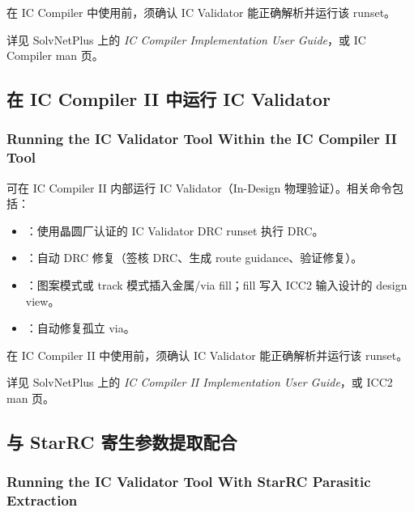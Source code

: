 \begin{noteBox}
在 IC Compiler 中使用前，须确认 IC Validator 能正确解析并运行该 runset。
\end{noteBox}

\begin{seeAlsoBox}
详见 SolvNetPlus 上的 \textit{IC Compiler Implementation User Guide}，或 IC Compiler man 页。
\end{seeAlsoBox}

\subsection{在 IC Compiler II 中运行 IC Validator}
\subsubsection*{Running the IC Validator Tool Within the IC Compiler II Tool}

可在 IC Compiler II 内部运行 IC Validator（In-Design 物理验证）。相关命令包括：
\begin{itemize}
  \item {}：使用晶圆厂认证的 IC Validator DRC runset 执行 DRC。
  \item {}：自动 DRC 修复（签核 DRC、生成 route guidance、验证修复）。
  \item {}：图案模式或 track 模式插入金属/via fill；fill 写入 ICC2 输入设计的 design view。
  \item {}：自动修复孤立 via。
\end{itemize}

\begin{noteBox}
在 IC Compiler II 中使用前，须确认 IC Validator 能正确解析并运行该 runset。
\end{noteBox}

\begin{seeAlsoBox}
详见 SolvNetPlus 上的 \textit{IC Compiler II Implementation User Guide}，或 ICC2 man 页。
\end{seeAlsoBox}

\subsection{与 StarRC 寄生参数提取配合}
\subsubsection*{Running the IC Validator Tool With StarRC Parasitic Extraction}

